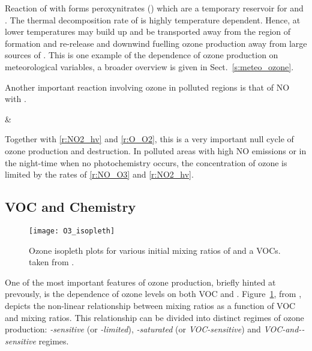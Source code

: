 Reaction of  with  forms peroxynitrates () which are a temporary reservoir for  and .
The thermal decomposition rate of  is highly temperature dependent.
Hence, at lower temperatures  may build up and be transported away from the region of formation and re-release  and  downwind fuelling ozone production away from large sources of .
This is one example of the dependence of ozone production on meteorological variables, a broader overview is given in Sect.~\ref{s:meteo_ozone}.


Another important reaction involving ozone in polluted regions is that of NO with .
\begin{rxnarray}
     & \rightarrow {} \label{r:NO_O3}
\end{rxnarray}
Together with \eqref{r:NO2_hv} and \eqref{r:O_O2}, this is a very important null cycle of ozone production and destruction.
In polluted areas with high NO emissions or in the night-time when no photochemistry occurs, the concentration of ozone is limited by the rates of \eqref{r:NO_O3} and \eqref{r:NO2_hv}.


\subsection[VOC and NOx Chemistry]{VOC and  Chemistry} \label{ss:VOC&NOx}
\begin{figure}
	\begin{center}
        \caption[Ozone mixing ratios as a function of  and VOC]{Ozone isopleth plots for various initial mixing ratios of  and a VOCs. taken from \citet{Jenkin:2000}.}
        \texttt{[image: O3\_isopleth]}
		\label{f:O3_isopleth}
	\end{center}
\end{figure}
One of the most important features of ozone production, briefly hinted at prevously, is the dependence of ozone levels on both VOC and .
Figure~\ref{f:O3_isopleth}, from \citet{Jenkin:2000}, depicts the non-linear relationship between  mixing ratios as a function of VOC and  mixing ratios.  
This relationship can be divided into distinct regimes of ozone production: \emph{-sensitive} (or \emph{-limited}), \emph{-saturated} (or \emph{VOC-sensitive}) and \emph{VOC-and--sensitive} regimes. 

